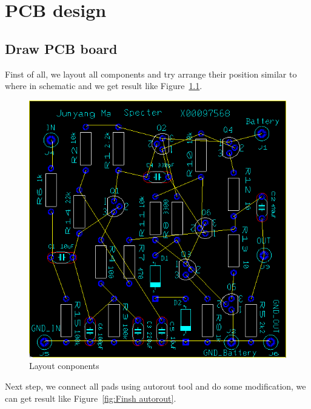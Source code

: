 \chapter{PCB design}  

\section{Draw PCB board}

Finst of all, we layout all components and try arrange their position similar to where in schematic and we get result like Figure~\ref{fig:Layout conponents}.
\begin{figure}[htbp]
	\centering
	\includegraphics[scale=0.7]{"../Photo/Chap6/final PCB not rout"}
	\caption{Layout conponents }
	\label{fig:Layout conponents}
\end{figure}

Next step, we connect all pads using autorout tool and do some modification, we can get result like Figure~\ref{fig:Finsh autorout}.


